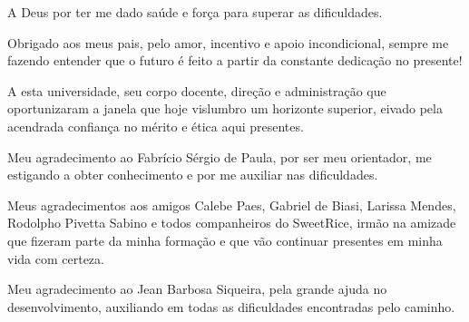 \documentclass[
	12pt,				%
	openright,			%
	twoside,			%
	a4paper,			%
	chapter=TITLE,		%
	english,			%
	brazil				%
	]{abntex2}
\begin{document}





\begin{agradecimentos}

A Deus por ter me dado saúde e força para superar as dificuldades.

Obrigado aos meus pais, pelo amor, incentivo e apoio incondicional, sempre me fazendo entender que o futuro é feito a partir da constante dedicação no presente!

A esta universidade, seu corpo docente, direção e administração que oportunizaram a janela que hoje vislumbro um horizonte superior, eivado pela acendrada confiança no mérito e ética aqui presentes.

Meu agradecimento ao Fabrício Sérgio de Paula, por ser meu orientador, me estigando a obter conhecimento e por me auxiliar nas dificuldades.

Meus agradecimentos aos amigos Calebe Paes, Gabriel de Biasi, Larissa Mendes, Rodolpho Pivetta Sabino e todos companheiros do SweetRice, irmão na amizade que fizeram parte da minha formação e que vão continuar presentes em minha vida com certeza.

Meu agradecimento ao Jean Barbosa Siqueira, pela grande ajuda no desenvolvimento, auxiliando em todas as dificuldades encontradas pelo caminho. 

 


\end{agradecimentos}

\end{document}
